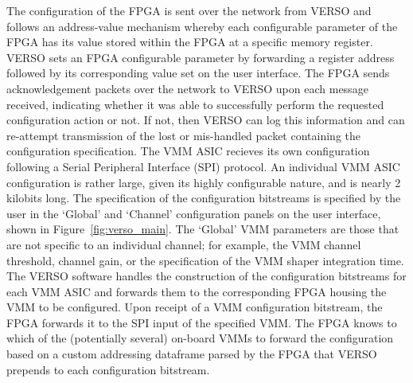\noindent The configuration of the FPGA is sent over the network from VERSO and
follows an address-value mechanism whereby each configurable parameter of the FPGA has its
value stored within the FPGA at a specific memory register.
VERSO sets an FPGA configurable parameter by forwarding a register address followed by its corresponding
value set on the user interface.
The FPGA sends acknowledgement packets over the network to VERSO upon each message received,
indicating whether it was able to successfully perform the requested configuration action or not.
If not, then VERSO can log this information and can re-attempt transmission of the lost or mis-handled packet
containing the configuration specification.
The VMM ASIC recieves its own configuration following a Serial Peripheral Interface (SPI) protocol.
An individual VMM ASIC configuration is rather large, given its highly configurable nature, and is
nearly 2 kilobits long.
The specification of the configuration bitstreams is specified by the user in the `Global' and `Channel' configuration
panels on the user interface, shown in Figure~\ref{fig:verso_main}.
The `Global' VMM parameters are those that are not specific to an individual channel; for example,
the VMM channel threshold, channel gain, or the specification of the VMM shaper integration time.
The VERSO software handles the construction of the configuration bitstreams for each VMM ASIC and forwards
them to the corresponding FPGA housing the VMM to be configured.
Upon receipt of a VMM configuration bitstream, the FPGA forwards it to the SPI input of the specified VMM.
The FPGA knows to which of the (potentially several) on-board VMMs to forward the configuration based on
a custom addressing dataframe parsed by the FPGA that VERSO prepends to each configuration bitstream.



